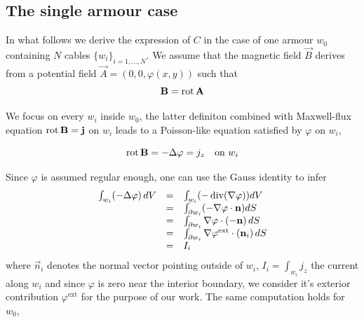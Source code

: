 \subsection*{The single armour case}
In what follows we derive the expression of $C$ in the case of one armour $w_0$ containing $N$ cables $\{ w_i \}_{i=1,...,N}$. We assume that the magnetic field $\vec{B}$ derives from a potential field $\vec{A}=(0,0,\varphi(x,y))$ such that 
\[
\label{def:B}
\mathbf B = \operatorname{rot}  \mathbf A
\]

We focus on every $w_i$ inside $w_0$, the latter definiton combined with Maxwell-flux equation $\operatorname{rot} \mathbf B = \mathbf j$ on $w_i$ leads to a Poisson-like equation satisfied by $\varphi$ on $w_i$,

\begin{equation}
\label{eq:poissonwi}
\operatorname{rot} \mathbf B = -\Delta \varphi = j_z \quad \text{on } w_i
\end{equation}

Since $\varphi$ is assumed regular enough, one can use the Gauss identity to infer
\begin{equation}
  \label{eq:traceeqn}
  \begin{array}{rcl}
    \int_{w_i} (-\Delta \varphi) \, dV &=& \int_{w_i} (- \operatorname{div} (\nabla \varphi))  dV \\
                                       &=& \int_{\partial w_i} (-\nabla\varphi \cdot \mathbf n) dS \\
                                       &=& \int_{\partial w_i} \nabla\varphi \cdot (-\mathbf n)  \, dS \\
                                       &=& \int_{ \partial w_i} \nabla\varphi^{\text{ext}} \cdot (\mathbf n_i)  \, dS \\
                                       &=& I_i \\
  \end{array}
\end{equation}
where $\vec{n}_i$ denotes the normal vector pointing outside of $w_i$, $I_i=\int_{w_i}j_z$ the current along $w_i$ and since $\varphi$ is zero near the interior boundary, we consider it's  exterior contribution $\varphi^{\text{ext}}$ for the purpose of our work. The same computation holds for $w_0$, 

